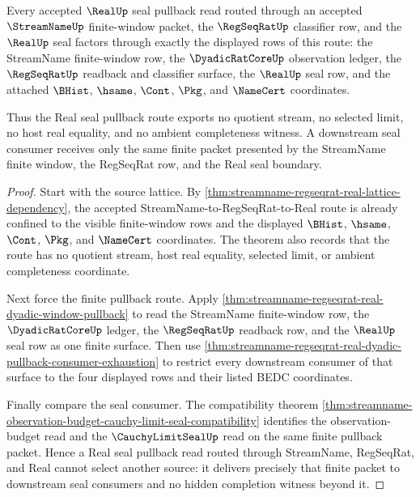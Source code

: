 \begin{theorem}
\label{thm:streamname-real-regseq-seal-pullback-exhaustion}
Every accepted $\RealUp$ seal pullback read routed through an accepted
$\StreamNameUp$ finite-window packet, the $\RegSeqRatUp$ classifier row, and
the $\RealUp$ seal factors through exactly the displayed rows of this route:
the StreamName finite-window row, the $\DyadicRatCoreUp$ observation ledger,
the $\RegSeqRatUp$ readback and classifier surface, the $\RealUp$ seal row,
and the attached $\BHist$, $\hsame$, $\Cont$, $\Pkg$, and $\NameCert$
coordinates.

Thus the Real seal pullback route exports no quotient stream, no selected
limit, no host real equality, and no ambient completeness witness. A
downstream seal consumer receives only the same finite packet presented by
the StreamName finite window, the RegSeqRat row, and the Real seal boundary.
\end{theorem}
\begin{proof}
Start with the source lattice. By
\autoref{thm:streamname-regseqrat-real-lattice-dependency}, the accepted
StreamName-to-RegSeqRat-to-Real route is already confined to the visible
finite-window rows and the displayed $\BHist$, $\hsame$, $\Cont$, $\Pkg$, and
$\NameCert$ coordinates. The theorem also records that the route has no
quotient stream, host real equality, selected limit, or ambient completeness
coordinate.

Next force the finite pullback route. Apply
\autoref{thm:streamname-regseqrat-real-dyadic-window-pullback} to read the
StreamName finite-window row, the $\DyadicRatCoreUp$ ledger, the
$\RegSeqRatUp$ readback row, and the $\RealUp$ seal row as one finite surface.
Then use
\autoref{thm:streamname-regseqrat-real-dyadic-pullback-consumer-exhaustion}
to restrict every downstream consumer of that surface to the four displayed
rows and their listed BEDC coordinates.

Finally compare the seal consumer. The compatibility theorem
\autoref{thm:streamname-observation-budget-cauchy-limit-seal-compatibility}
identifies the observation-budget read and the $\CauchyLimitSealUp$ read on
the same finite pullback packet. Hence a Real seal pullback read routed
through StreamName, RegSeqRat, and Real cannot select another source: it
delivers precisely that finite packet to downstream seal consumers and no
hidden completion witness beyond it.
\end{proof}

